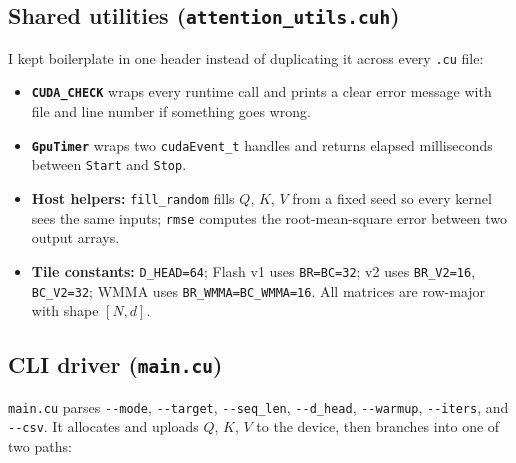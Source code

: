 \documentclass[12pt]{article}
\begin{document}
\subsection{Shared utilities (\texttt{attention\_utils.cuh})}

I kept boilerplate in one header instead of duplicating it across every \texttt{.cu} file:
\begin{itemize}
    \item \textbf{\texttt{CUDA\_CHECK}} wraps every runtime call and prints a clear error message with file and line number if something goes wrong.
    \item \textbf{\texttt{GpuTimer}} wraps two \texttt{cudaEvent\_t} handles and returns elapsed milliseconds between \texttt{Start} and \texttt{Stop}.
    \item \textbf{Host helpers:} \texttt{fill\_random} fills $Q$, $K$, $V$ from a fixed seed so every kernel sees the same inputs; \texttt{rmse} computes the root-mean-square error between two output arrays.
    \item \textbf{Tile constants:} \texttt{D\_HEAD=64}; Flash v1 uses \texttt{BR=BC=32}; v2 uses \texttt{BR\_V2=16}, \texttt{BC\_V2=32}; WMMA uses \texttt{BR\_WMMA=BC\_WMMA=16}. All matrices are row-major with shape $[N, d]$.
\end{itemize}



\subsection{CLI driver (\texttt{main.cu})}

\texttt{main.cu} parses \verb|--mode|, \verb|--target|, \verb|--seq_len|, \verb|--d_head|, \verb|--warmup|, \verb|--iters|, and \verb|--csv|. It allocates and uploads $Q$, $K$, $V$ to the device, then branches into one of two paths:
\end{document}
